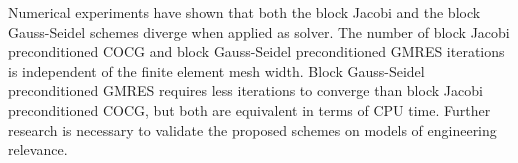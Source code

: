 \documentclass{article}
\begin{document}
 

Numerical experiments have shown that both the block Jacobi and the block 
Gauss-Seidel schemes diverge when applied as solver. The number of block 
Jacobi preconditioned COCG and block Gauss-Seidel preconditioned GMRES 
iterations is independent of the finite element mesh width. Block Gauss-Seidel
preconditioned GMRES requires less iterations to converge than block 
Jacobi preconditioned COCG, but both are equivalent in terms of CPU time. 
Further research is necessary to validate the proposed schemes on models of 
engineering relevance. 
\end{document}
